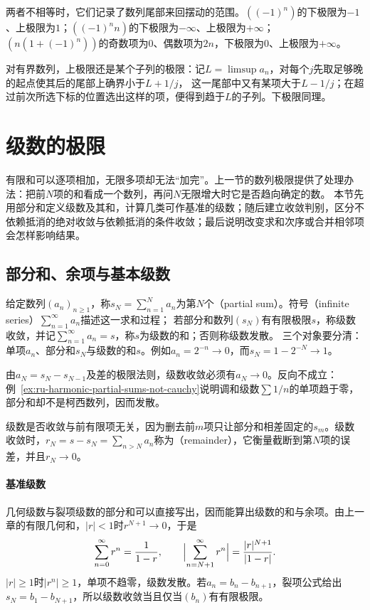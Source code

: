 两者不相等时，它们记录了数列尾部来回摆动的范围。$((-1)^n)$的下极限为$-1$、上极限为$1$；$((-1)^nn)$的下极限为$-\infty$、上极限为$+\infty$；
$(n(1+(-1)^n))$的奇数项为$0$、偶数项为$2n$，下极限为$0$、上极限为$+\infty$。

对有界数列，上极限还是某个子列的极限：记$L=\limsup a_n$，对每个$j$先取足够晚的起点使其后的尾部上确界小于$L+1/j$，
这一尾部中又有某项大于$L-1/j$；在超过前次所选下标的位置选出这样的项，便得到趋于$L$的子列。下极限同理。
\section{级数的极限}
\label{sec:ru-series}
\label{sec:analysis-series}

有限和可以逐项相加，无限多项却无法“加完”。上一节的数列极限提供了处理办法：把前$N$项的和看成一个数列，再问$N$无限增大时它是否趋向确定的数。
本节先用部分和定义级数及其和，计算几类可作基准的级数；随后建立收敛判别，区分不依赖抵消的绝对收敛与依赖抵消的条件收敛；最后说明改变求和次序或合并相邻项会怎样影响结果。

\subsection{部分和、余项与基本级数}
\label{sec:ru-partial-sums}
\label{sec:analysis-series-definition}

给定数列$(a_n)_{n\geq1}$，称$s_N=\sum_{n=1}^Na_n$为第$N$个（partial sum）。符号（infinite series）$\sum_{n=1}^\infty a_n$描述这一求和过程；
若部分和数列$(s_N)$有有限极限$s$，称级数收敛，并记$\sum_{n=1}^\infty a_n=s$，称$s$为级数的和；否则称级数发散。
三个对象要分清：单项$a_n$、部分和$s_N$与级数的和$s$。例如$a_n=2^{-n}\to0$，而$s_N=1-2^{-N}\to1$。

由$a_N=s_N-s_{N-1}$及差的极限法则，级数收敛必须有$a_N\to0$。反向不成立：例~\ref{ex:ru-harmonic-partial-sums-not-cauchy}说明调和级数$\sum1/n$的单项趋于零，部分和却不是柯西数列，因而发散。

级数是否收敛与前有限项无关，因为删去前$m$项只让部分和相差固定的$s_m$。级数收敛时，$r_N=s-s_N=\sum_{n>N}a_n$称为（remainder），它衡量截断到第$N$项的误差，并且$r_N\to0$。

\paragraph{基准级数}
几何级数与裂项级数的部分和可以直接写出，因而能算出级数的和与余项。由上一章的有限几何和，$|r|<1$时$r^{N+1}\to0$，于是
\begin{equation}
 \sum_{n=0}^\infty r^n=\frac1{1-r},\qquad \Bigl|\sum_{n=N+1}^\infty r^n\Bigr|=\frac{|r|^{N+1}}{|1-r|}.
 \label{eq:analysis-geometric-series}
\end{equation}
$|r|\geq1$时$|r^n|\geq1$，单项不趋零，级数发散。若$a_n=b_n-b_{n+1}$，裂项公式给出$s_N=b_1-b_{N+1}$，所以级数收敛当且仅当$(b_n)$有有限极限。

